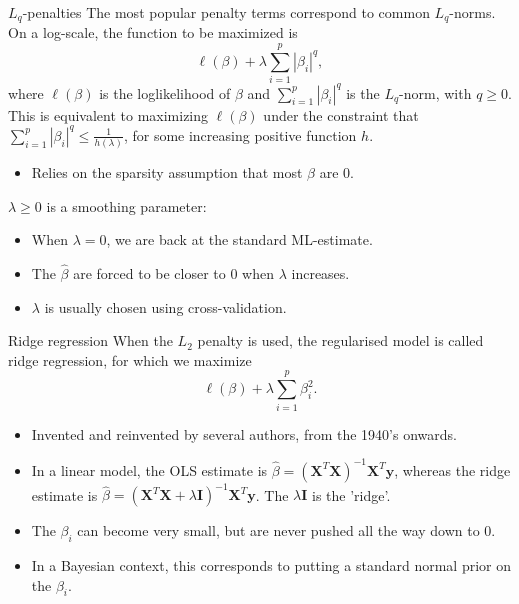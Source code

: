 \documentclass[10pt]{beamer}
\begin{document}
\begin{frame}{$L_q$-penalties}
The most popular penalty terms correspond to common {\color{uured}$L_q$-norms}. \pause On a log-scale, the function to be maximized is
$$\ell(\beta)+\lambda\sum_{i=1}^p|\beta_i|^q,$$
where $\ell(\beta)$ is the loglikelihood of $\beta$ and $\sum_{i=1}^p|\beta_i|^q$ is the $L_q$-norm, with $q\geq 0$.\\[3mm]\pause
This is equivalent to maximizing $\ell(\beta)$ under the constraint that $\sum_{i=1}^p|\beta_i|^q\leq\frac{1}{h(\lambda)}$, for some increasing positive function $h$.\pause
\begin{itemize}
\item Relies on the {\color{uured}sparsity} assumption that most $\beta$ are 0.\\[3mm]\pause
\end{itemize}
$\lambda\geq 0$ is a {\color{uured}smoothing parameter}:
\begin{itemize}
\item When $\lambda=0$, we are back at the standard ML-estimate.
\item The $\hat{\beta}$ are forced to be closer to 0 when $\lambda$ increases.
\item $\lambda$ is usually chosen using cross-validation.
\end{itemize}
\end{frame}


\begin{frame}{Ridge regression}
When the $L_2$ penalty is used, the regularised model is called {\color{uured}ridge regression}, for which we maximize
$$\ell(\beta)+\lambda\sum_{i=1}^p\beta_i^2.$$
\begin{itemize}
\item Invented and reinvented by several authors, from the 1940's onwards.\\[3mm]\pause
\item In a linear model, the OLS estimate is $\hat{\beta}=(\mathbf{X}^T\mathbf{X})^{-1}\mathbf{X}^T\mathbf{y}$, whereas the ridge estimate is $\hat{\beta}=(\mathbf{X}^T\mathbf{X}+\lambda \mathbf{I})^{-1}\mathbf{X}^T\mathbf{y}$. The $\lambda \mathbf{I}$ is the 'ridge'.\\[3mm]\pause
\item The $\beta_i$ can become very small, but are never pushed all the way down to 0.\\[3mm]\pause
\item In a Bayesian context, this corresponds to putting a standard normal prior on the $\beta_i$.
\end{itemize}
\end{frame}
\end{document}
